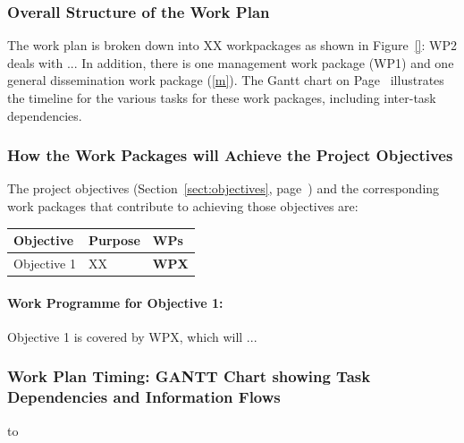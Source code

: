 \documentclass[a4paper,11pt]{article}
\begin{document}
\subsubsection*{Overall Structure of the Work Plan}

The work plan is broken down into XX workpackages as shown
in Figure~\ref{}: WP2 deals with  ...
In addition, there is one management work package (WP1) and one
general dissemination work package (\ref{m}). The Gantt chart on
Page~\pageref{fig:gantt} illustrates the timeline for the
various tasks for these work packages, including inter-task
dependencies.

\subsubsection*{How the Work Packages will Achieve the Project Objectives}
\label{sssec:how_the_work_packages_will_achieve}


The project objectives (Section~\ref{sect:objectives},
page~\pageref{sect:objectives}) and the corresponding work
packages that contribute to achieving those objectives are:

\begin{center}
\begin{tabular}{|l|l|l|}\hline
\textbf{Objective} & \textbf{Purpose} & \textbf{WPs} \\\hline \hline
Objective 1 & XX & \textbf{WPX} \\\hline
\end{tabular}
\end{center}

\paragraph*{Work Programme for Objective 1: }

Objective 1 is covered by WPX, which will ...

\landscape

\subsubsection*{Work Plan Timing: GANTT Chart showing Task Dependencies and Information Flows}


\vspace{-0.7in} \centerline{\hbox to \columnwidth{\hss%
\hss}}
\label{fig:gantt}
\vspace{-1in} %
\endlandscape
\end{document}
